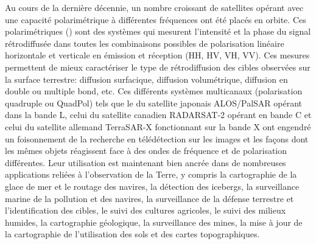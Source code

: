
Au cours de la dernière décennie, un nombre croissant de satellites \acrsar opérant avec une capacité polarimétrique à différentes fréquences ont été placés en orbite. Ces \acrsar polarimétriques (\acrpolsarns) sont des systèmes \acrsar qui mesurent l’intensité et la phase du signal rétrodiffusée dans toutes les combinaisons possibles de polarisation linéaire horizontale et verticale en émission et réception (HH, HV, VH, VV). Ces mesures permettent de mieux caractériser le type de rétrodiffusion des cibles observées sur la surface terrestre: diffusion surfacique, diffusion volumétrique, diffusion en double ou multiple bond, etc. Ces différents systèmes \acrpolsar multicanaux (polarisation quadruple ou QuadPol) tels que le \acrsar du satellite japonais ALOS/PalSAR opérant dans la bande L, celui du satellite canadien RADARSAT-2 opérant en bande C et celui du satellite allemand TerraSAR-X fonctionnant sur la bande X ont engendré un foisonnement de la recherche en télédétection sur les images \acrpolsar et les façons dont les mêmes objets réagissent face à des ondes de fréquence et de polarisation différentes. Leur utilisation est maintenant bien ancrée dans de nombreuses applications reliées à l’observation de la Terre, y compris la cartographie de la glace de mer et le routage des navires, la détection des icebergs, la surveillance marine de la pollution et des navires, la surveillance de la défense terrestre et l’identification des cibles, le suivi des cultures agricoles, le suivi des milieux humides, la cartographie géologique, la surveillance des mines, la mise à jour de la cartographie de l’utilisation des sols et des cartes topographiques. 

